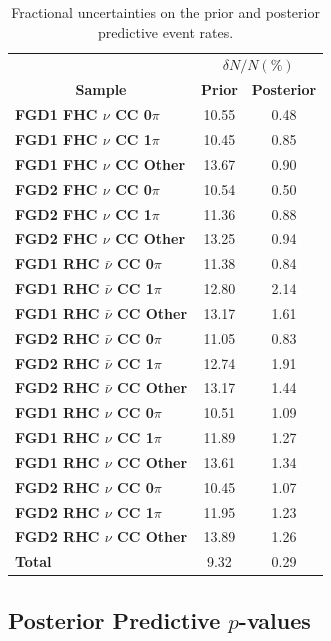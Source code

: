 \begin{center}
\begin{table}[!htbp]
\center
\begin{tabular}{l||c c}
\hline \hline
& \multicolumn{2}{c}{$\delta N/N(\%)$}\\
\multicolumn{1}{c||}{\textbf{Sample}} & \multicolumn{1}{c}{\textbf{Prior}} & \multicolumn{1}{c}{\textbf{Posterior}} \\
\hline\hline
\textbf{FGD1 FHC $\nu$ CC 0$\pi$} & 10.55 & 0.48\\
\textbf{FGD1 FHC $\nu$ CC 1$\pi$} & 10.45 & 0.85\\ 
\textbf{FGD1 FHC $\nu$ CC Other} & 13.67 & 0.90\\ \hline
\textbf{FGD2 FHC $\nu$ CC 0$\pi$} & 10.54 & 0.50\\
\textbf{FGD2 FHC $\nu$ CC 1$\pi$} & 11.36 & 0.88\\
\textbf{FGD2 FHC $\nu$ CC Other} & 13.25 & 0.94\\ \hline
\textbf{FGD1 RHC $\bar{\nu}$ CC 0$\pi$} & 11.38 & 0.84\\
\textbf{FGD1 RHC $\bar{\nu}$ CC 1$\pi$} & 12.80 & 2.14\\
\textbf{FGD1 RHC $\bar{\nu}$ CC Other} & 13.17 & 1.61\\ \hline
\textbf{FGD2 RHC $\bar{\nu}$ CC 0$\pi$} & 11.05 & 0.83\\
\textbf{FGD2 RHC $\bar{\nu}$ CC 1$\pi$} & 12.74 & 1.91\\
\textbf{FGD2 RHC $\bar{\nu}$ CC Other} & 13.17 & 1.44\\ \hline
\textbf{FGD1 RHC $\nu$ CC 0$\pi$} & 10.51 & 1.09\\
\textbf{FGD1 RHC $\nu$ CC 1$\pi$} & 11.89 & 1.27\\
\textbf{FGD1 RHC $\nu$ CC Other} & 13.61 & 1.34\\ \hline
\textbf{FGD2 RHC $\nu$ CC 0$\pi$} & 10.45 & 1.07\\
\textbf{FGD2 RHC $\nu$ CC 1$\pi$} & 11.95 & 1.23\\ 
\textbf{FGD2 RHC $\nu$ CC Other} & 13.89 & 1.26\\ \hline
\textbf{Total} & 9.32 & 0.29 \\ \hline\hline
\end{tabular}
\caption{Fractional uncertainties on the prior and posterior predictive event rates.}
\label{tab:prederr}
\end{table}
\end{center}

\subsection{Posterior Predictive $p$-values}

